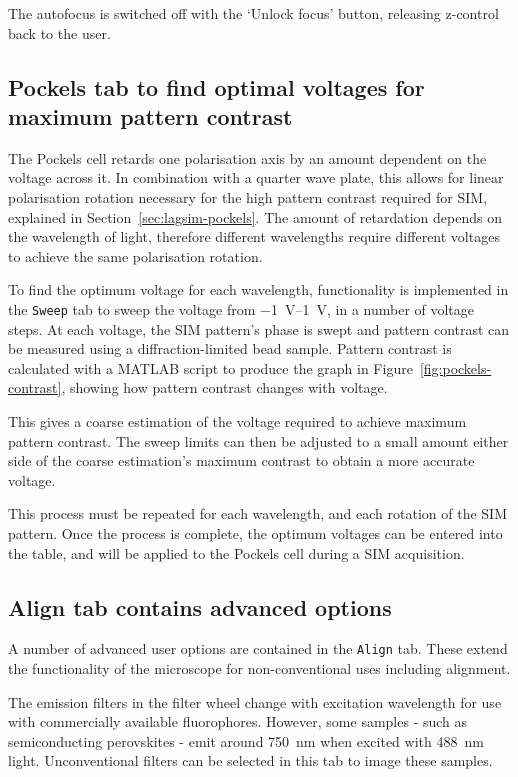 The autofocus is switched off with the `Unlock focus' button, releasing z-control back to the user. 

\subsection{Pockels tab to find optimal voltages for maximum pattern contrast} 
The Pockels cell retards one polarisation axis by an amount dependent on the voltage across it. 
In combination with a quarter wave plate, this allows for linear polarisation rotation necessary for the high pattern contrast required for SIM, explained in Section~\ref{sec:lagsim-pockels}. 
The amount of retardation depends on the wavelength of light, therefore different wavelengths require different voltages to achieve the same polarisation rotation. 

To find the optimum voltage for each wavelength, functionality is implemented in the \texttt{Sweep} tab to sweep the voltage from \SIrange{-1}{1}{\volt}, in a number of voltage steps. 
At each voltage, the SIM pattern's phase is swept and pattern contrast can be measured using a diffraction-limited bead sample. 
Pattern contrast is calculated with a MATLAB script to produce the graph in Figure~\ref{fig:pockels-contrast}, showing how pattern contrast changes with voltage. 

This gives a coarse estimation of the voltage required to achieve maximum pattern contrast. 
The sweep limits can then be adjusted to a small amount either side of the coarse estimation's maximum contrast to obtain a more accurate voltage. 

This process must be repeated for each wavelength, and each rotation of the SIM pattern. 
Once the process is complete, the optimum voltages can be entered into the table, and will be applied to the Pockels cell during a SIM acquisition. 


\subsection{Align tab contains advanced options}
A number of advanced user options are contained in the \texttt{Align} tab. 
These extend the functionality of the microscope for non-conventional uses including alignment. 

The emission filters in the filter wheel change with excitation wavelength for use with commercially available fluorophores.
However, some samples - such as semiconducting perovskites - emit around \SI{750}{\nano\metre} when excited with \SI{488}{\nano\metre} light. 
Unconventional filters can be selected in this tab to image these samples. 


